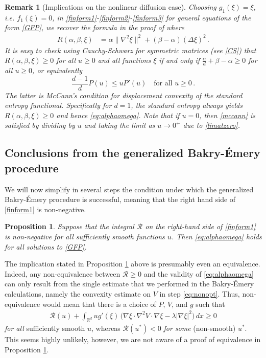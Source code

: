 \documentclass[reqno]{amsart}
\newtheorem{remark}[lemma]{Remark}
\newtheorem{prop}[lemma]{Proposition}
\newcommand{\R}{\mathbb{R}}
\newcommand{\be}{\begin{equation}}
\newcommand{\ee}{\end{equation}}
\begin{document}
\begin{remark}[Implications on the nonlinear diffusion case]\label{StandardEntropy}
Choosing $g_1(\xi)=\xi$, i.e. $f_1(\xi)=0$, in \eqref{finform1}-\eqref{finform2}-\eqref{finform3} for general equations of the form \eqref{GFP}, we recover the formula in the proof of \cite[Theorem 11]{CJMTU} where
\begin{align}\label{cjmtu}
R(\alpha,\beta,\xi) &= \alpha \|\nabla^2\xi\|^2 
                        + (\beta-\alpha)(\Delta\xi)^2 \,.
\end{align}
It is easy to check using Cauchy-Schwarz for symmetric matrices (see \eqref{CS}) that $R(\alpha,\beta,\xi)\ge 0$ for all $u\geq 0$ and all functions $\xi$ if and only if $\tfrac{\alpha}{d}+\beta-\alpha\geq 0$ for all $u\geq 0$, or equivalently
\be\label{mccann}
\frac{d-1}{d} P(u) \leq uP'(u)\quad \mbox{for all } u\geq 0\,.
\ee
The latter is McCann's condition \cite{McCann} for displacement convexity of the standard entropy functional.
Specifically for $d=1$, the standard entropy always yields $R(\alpha,\beta,\xi)\ge 0$ and hence \eqref{eq:alphaomega}. Note that if $u=0$, then \eqref{mccann} is satisfied by dividing by $u$ and taking the limit as $u\to 0^+$ due to \eqref{limatzero}.
\end{remark}

\subsection{Conclusions from the generalized Bakry-\'Emery procedure}
%
We will now simplify in several steps the condition under which the generalized Bakry-\'Emery procedure is successful, meaning that the right hand side of \eqref{finform1} is non-negative.
%
\begin{prop}\label{expdecay}
  Suppose that the integral $\mathcal R$ on the right-hand side of \eqref{finform1} is non-negative for all sufficiently smooth functions $u$.
  Then \eqref{eq:alphaomega} holds for all solutions to \eqref{GFP}.
\end{prop}
%
The implication stated in Proposition \ref{expdecay} above is presumably even an equivalence.
Indeed, any non-equivalence between $\mathcal R\ge0$ and the validity of \eqref{eq:alphaomega} can only result from the single estimate that we performed in the Bakry-\'Emery calculations, namely the convexity estimate on $V$ in step \eqref{eq:nonopt}.
Thus, non-equivalence would mean that there is a choice of $P$, $V$, and $g$ such that 
\begin{align*}
  \mathcal R(u) + \int_{\R^d}ug'(\xi)\,\big(\nabla\xi\cdot\nabla^2V \cdot\nabla \xi-\lambda|\nabla\xi|^2\big)\,dx \ge 0
\end{align*}
\emph{for all} sufficiently smooth $u$, whereas $\mathcal R(u^*)<0$ \emph{for some} (non-smooth) $u^*$.
This seems highly unlikely, however, we are not aware of a proof of equivalence in Proposition \ref{expdecay}.
\end{document}
